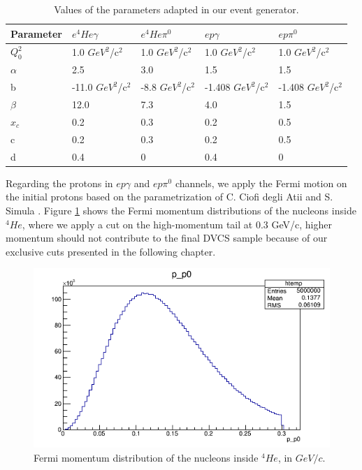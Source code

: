 \begin {table}[tbp]
\begin{center}
\begin{tabular}{|l|l|l|l|l|}
\hline
Parameter & $e^{4}He\gamma$  & $e^{4}He\pi^{0}$ & $ep\gamma$  & $ep\pi^{0}$ \\
\hline
$Q^{2}_{0}$ & 1.0 $GeV^{2}$/c$^{2}$ & 1.0 $GeV^{2}$/c$^{2}$ & 1.0 $GeV^{2}$/c$^{2}$ & 1.0 $GeV^{2}$/c$^{2}$ \\
\hline
$\alpha$ & 2.5 & 3.0 & 1.5 & 1.5 \\
\hline
b & -11.0 $GeV^{2}$/c$^{2}$ & -8.8 $GeV^{2}$/c$^{2}$ & -1.408 $GeV^{2}$/c$^{2}$& -1.408 $GeV^{2}$/c$^{2}$\\
\hline
$\beta$ & 12.0 & 7.3 & 4.0 & 1.5\\
\hline
$x_{c}$ & 0.2 & 0.3 & 0.2 & 0.5\\
\hline
c & 0.2 & 0.3 & 0.2 & 0.5 \\
\hline
d & 0.4 & 0 & 0.4 & 0 \\
\hline
\end{tabular}
\caption{ Values of the parameters adapted in our event generator.}
\label{Table:event_generator_values}
\end{center}
\end{table}

Regarding the protons in $ep\gamma$ and $ep\pi^{0}$ channels, we apply the 
Fermi motion on the initial protons based on the parametrization of C. Ciofi 
degli Atii and S. Simula \cite{fermi_motion}. Figure \ref{fig:fermi_mom} shows 
the Fermi momentum distributions of the nucleons inside $^{4}He$, where we 
apply a cut on the high-momentum tail at 0.3 GeV/c, higher momentum should not 
contribute to the final DVCS sample because of our exclusive cuts presented in 
the following chapter. 

\begin{figure}[tbp]
\centering
\includegraphics[scale=.55]{fig_analysis/fermi_momentum_dis.png}
\caption{ Fermi momentum distribution of the nucleons inside $^{4}He$, in 
$GeV/c$.} \label{fig:fermi_mom}
\end{figure}



